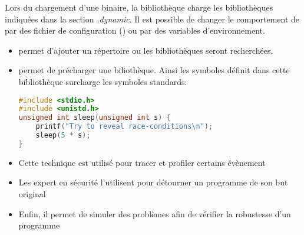 
\begin{frame}[fragile=singleslide]{}
  Lors du chargement d'une binaire, la bibliothèque  charge
  les bibliothèques indiquées dans  la section \emph{.dynamic}. Il est
  possible de  changer le comportement de   par des fichier
  de  configuration  ()  ou  par  des  variables
  d'environnement.
  \begin{itemize} 
  \item  {} permet d'ajouter  un répertoire  ou les
    bibliothèques seront recherchées.
  \item {} permet de précharger une biliothèque.  Ainsi
    les  symboles  définit   dans  cette  bibliothèque  surcharge  les
    symboles standards:
    \begin{lstlisting}[language=c]
#include <stdio.h>
#include <unistd.h>
unsigned int sleep(unsigned int s) {
    printf("Try to reveal race-conditions\n");
    sleep(5 * s);
}
    \end{lstlisting} 
  \end{itemize}
\end{frame}  

\begin{frame}[fragile=singleslide]{}
  \begin{itemize} 
    \begin{lstlisting} 
host$ gcc -shared -fPIC mysleep.c -o libmysleep.so
target$ LD_PRELOAD=libmysleep.so ./hello 
target$ export LD_PRELOAD=libmysleep.so
taregt$ ./hello 
    \end{lstlisting} 
  \item Cette  technique est utilisé pour tracer  et profiler certains
    évènement
  \item Les expert en sécurité l'utilisent pour détourner un programme
    de son but original
  \item Enfin, il permet de  simuler des problèmes afin de vérifier la
    robustesse d'un programme
  \end{itemize} 
\end{frame}

